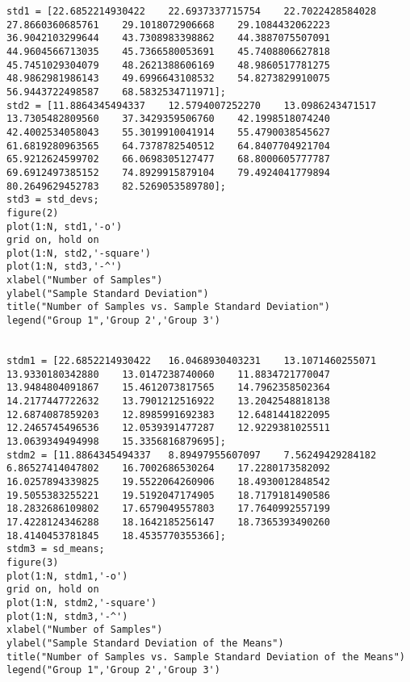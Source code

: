 \documentclass[conf]{new-aiaa}
\begin{document}
\begin{lstlisting}[style=Matlab-editor]
std1 = [22.6852214930422	22.6937337715754	22.7022428584028	27.8660360685761	29.1018072906668	29.1084432062223	36.9042103299644	43.7308983398862	44.3887075507091	44.9604566713035	45.7366580053691	45.7408806627818	45.7451029304079	48.2621388606169	48.9860517781275	48.9862981986143	49.6996643108532	54.8273829910075	56.9443722498587	68.5832534711971];
std2 = [11.8864345494337	12.5794007252270	13.0986243471517	13.7305482809560	37.3429359506760	42.1998518074240	42.4002534058043	55.3019910041914	55.4790038545627	61.6819280963565	64.7378782540512	64.8407704921704	65.9212624599702	66.0698305127477	68.8000605777787	69.6912497385152	74.8929915879104	79.4924041779894	80.2649629452783	82.5269053589780];
std3 = std_devs;
figure(2)
plot(1:N, std1,'-o')
grid on, hold on
plot(1:N, std2,'-square')
plot(1:N, std3,'-^')
xlabel("Number of Samples")
ylabel("Sample Standard Deviation")
title("Number of Samples vs. Sample Standard Deviation")
legend("Group 1",'Group 2','Group 3')


stdm1 = [22.6852214930422	16.0468930403231	13.1071460255071	13.9330180342880	13.0147238740060	11.8834721770047	13.9484804091867	15.4612073817565	14.7962358502364	14.2177447722632	13.7901212516922	13.2042548818138	12.6874087859203	12.8985991692383	12.6481441822095	12.2465745496536	12.0539391477287	12.9229381025511	13.0639349494998	15.3356816879695];
stdm2 = [11.8864345494337	8.89497955607097	7.56249429284182	6.86527414047802	16.7002686530264	17.2280173582092	16.0257894339825	19.5522064260906	18.4930012848542	19.5055383255221	19.5192047174905	18.7179181490586	18.2832686109802	17.6579049557803	17.7640992557199	17.4228124346288	18.1642185256147	18.7365393490260	18.4140453781845	18.4535770355366];
stdm3 = sd_means;
figure(3)
plot(1:N, stdm1,'-o')
grid on, hold on
plot(1:N, stdm2,'-square')
plot(1:N, stdm3,'-^')
xlabel("Number of Samples")
ylabel("Sample Standard Deviation of the Means")
title("Number of Samples vs. Sample Standard Deviation of the Means")
legend("Group 1",'Group 2','Group 3')
\end{lstlisting}
\end{document}
